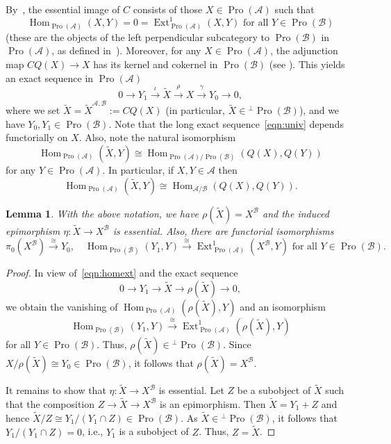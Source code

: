 \documentclass[11pt]{article}
\newtheorem{lemm}[theo]{Lemma}
\theoremstyle{definition}
\numberwithin{equation}{section}
\newcommand\cA{{\mathcal A}}
\newcommand\cB{{\mathcal B}}
\newcommand\tX{{\widetilde X}}
\DeclareMathOperator{\Ext}{Ext}
\DeclareMathOperator{\Hom}{Hom}
\DeclareMathOperator{\Pro}{Pro}
\theoremstyle{remark}
\begin{document}
By~\cite[III.2.Cor.]{Gabriel}, the essential image of $C$ consists of those $X \in \Pro(\cA)$ such that
\begin{equation}\label{eqn:homext}
\Hom_{\Pro(\cA)}(X,Y) = 0 = \Ext^1_{\Pro(\cA)}(X,Y)
\text{ for all } Y \in \Pro(\cB)
\end{equation}
(these are the objects of the left perpendicular subcategory to $\Pro(\cB)$ in $\Pro(\cA)$, as defined in~\cite{GL}). Moreover, for any $X \in \Pro(\cA)$, the adjunction map $CQ(X) \to X$ has its kernel and cokernel in $\Pro(\cB)$ (see \cite[III.2.Prop.~3]{GL}). This yields an exact sequence in $\Pro(\cA)$
\begin{equation}\label{eqn:univ}
0 \longrightarrow Y_1
\stackrel{\iota}{\longrightarrow} \tX
\stackrel{\rho}{\longrightarrow} X
\stackrel{\gamma}{\longrightarrow} Y_0
\longrightarrow 0,
\end{equation}
where we set $\tX = \tX^{\cA,\cB} := CQ(X)$ (in particular, $\tX \in {^{\perp}\Pro(\cB)}$), and we have $Y_0,Y_1 \in \Pro(\cB)$. Note that the long exact sequence~\eqref{eqn:univ} depends functorially on $X$. Also, note the natural isomorphism
\[
\Hom_{\Pro(\cA)}(\tX,Y) \cong
\Hom_{\Pro(\cA)/\Pro(\cB)}(Q(X),Q(Y))
\]
for any $Y \in \Pro(\cA)$. In particular, if $X,Y \in \cA$ then
\begin{equation}\label{eqn:adj}
\Hom_{\Pro(\cA)}(\tX,Y) \cong \Hom_{\cA/\cB}(Q(X),Q(Y)).
\end{equation}

\begin{lemm}\label{lem:isos}
With the above notation, we have $\rho(\tX) = X^{\cB}$ and the induced epimorphism $\eta: \tX \to X^{\cB}$ is essential. Also, there are functorial isomorphisms
\[
\pi_0(X^{\cB}) \stackrel{\cong}{\longrightarrow} Y_0, \quad
\Hom_{\Pro(\cB)}(Y_1,Y) \stackrel{\cong}{\longrightarrow}
\Ext^1_{\Pro(\cA)}(X^{\cB}, Y) \text{ for all } Y \in \Pro(\cB).
\]
\end{lemm}

\begin{proof}
In view of~\eqref{eqn:homext} and the exact sequence
\[
0 \longrightarrow Y_1 \longrightarrow \tX \longrightarrow
\rho(\tX) \longrightarrow 0,
\]
we obtain the vanishing of $\Hom_{\Pro(\cA)}(\rho(\tX),Y)$ and an isomorphism
\[
\Hom_{\Pro(\cB)}(Y_1,Y) \stackrel{\cong}{\longrightarrow}
\Ext^1_{\Pro(\cA)}(\rho(\tX), Y)
\]
for all $Y \in \Pro(\cB)$. Thus, $\rho(\tX) \in {^{\perp}\Pro(\cB)}$. Since $X/\rho(\tX) \cong Y_0 \in \Pro(\cB)$, it follows that $\rho(\tX) = X^{\cB}$.

It remains to show that $\eta : \tX \to X^{\cB}$ is essential. Let $Z$ be a subobject of $\tX$ such that the composition $Z \to \tX \to X^{\cB}$ is an epimorphism. Then $\tX = Y_1 + Z$ and hence $\tX/Z \cong Y_1/(Y_1 \cap Z) \in \Pro(\cB)$. As $\tX \in {^{\perp}\Pro(\cB)}$, it follows that $Y_1/(Y_1 \cap Z) = 0$, i.e., $Y_1$ is a subobject of $Z$. Thus, $Z = \tX$.
\end{proof}
\end{document}
